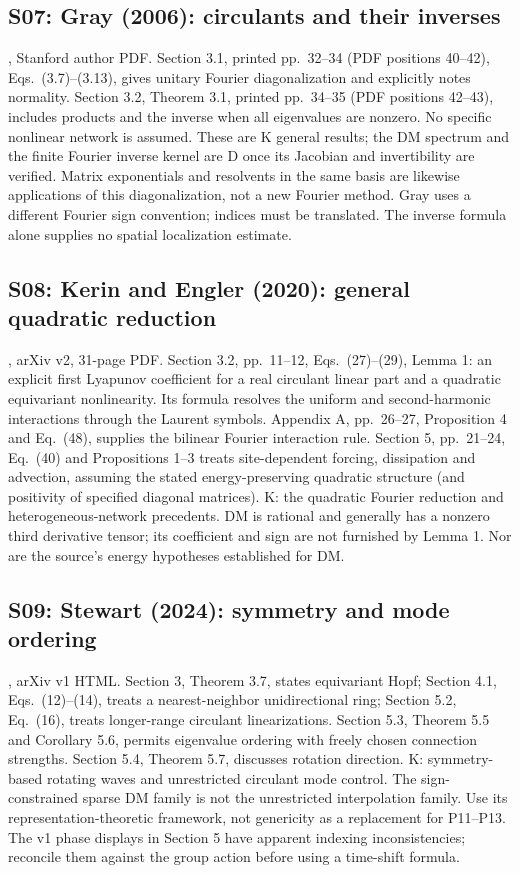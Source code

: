 \subsection{S07: Gray (2006): circulants and their inverses}
\label{src:gray}
\cite{Gray2006}, Stanford author PDF. Section 3.1, printed pp.~32--34
(PDF positions 40--42), Eqs.~(3.7)--(3.13), gives unitary Fourier
diagonalization and explicitly notes normality. Section 3.2,
Theorem 3.1, printed pp.~34--35 (PDF positions 42--43), includes
products and the inverse when all eigenvalues are nonzero.
No specific nonlinear network is assumed. These are K general results;
the DM spectrum and the finite Fourier inverse kernel are D once its
Jacobian and invertibility are verified. Matrix exponentials and
resolvents in the same basis are likewise applications of this
diagonalization, not a new Fourier method. Gray uses a different
Fourier sign convention; indices must be translated. The inverse
formula alone supplies no spatial localization estimate.

\subsection{S08: Kerin and Engler (2020): general quadratic reduction}
\label{src:kerin}
\cite{KerinEngler2020}, arXiv v2, 31-page PDF. Section 3.2,
pp.~11--12, Eqs.~(27)--(29), Lemma 1: an explicit first Lyapunov
coefficient for a real circulant linear part and a quadratic
equivariant nonlinearity. Its formula resolves the uniform and
second-harmonic interactions through the Laurent symbols.
Appendix A, pp.~26--27, Proposition 4 and Eq.~(48), supplies the
bilinear Fourier interaction rule. Section 5, pp.~21--24,
Eq.~(40) and Propositions 1--3 treats site-dependent forcing,
dissipation and advection, assuming the stated energy-preserving
quadratic structure (and positivity of specified diagonal matrices).
K: the quadratic Fourier reduction and heterogeneous-network
precedents. DM is rational and generally has a nonzero third
derivative tensor; its coefficient and sign are not furnished by
Lemma 1. Nor are the source's energy hypotheses established for DM.

\subsection{S09: Stewart (2024): symmetry and mode ordering}
\label{src:stewart}
\cite{Stewart2024}, arXiv v1 HTML. Section 3, Theorem 3.7,
states equivariant Hopf; Section 4.1, Eqs.~(12)--(14), treats a
nearest-neighbor unidirectional ring; Section 5.2, Eq.~(16),
treats longer-range circulant linearizations. Section 5.3,
Theorem 5.5 and Corollary 5.6, permits eigenvalue ordering with
freely chosen connection strengths. Section 5.4, Theorem 5.7,
discusses rotation direction. K: symmetry-based rotating waves
and unrestricted circulant mode control. The sign-constrained
sparse DM family is not the unrestricted interpolation family.
Use its representation-theoretic framework, not genericity as
a replacement for P11--P13. The v1 phase displays in Section 5
have apparent indexing inconsistencies; reconcile them against
the group action before using a time-shift formula.

